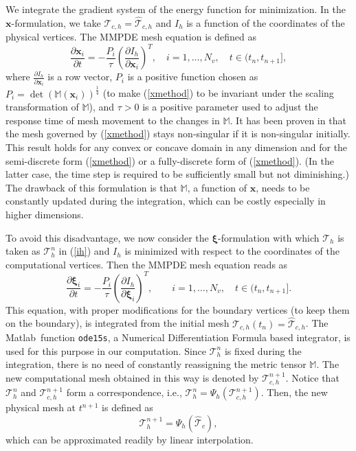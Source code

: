\documentclass{siamart0516}
\def \M{\mathbb{M}}
\newcommand{\bx}{\mathbf{x}}
\newcommand{\bxi}{\bs{\xi}}
\newcommand{\bs}[0]{\boldsymbol}
\theoremstyle{plain}%
\theoremstyle{definition}
\theoremstyle{remark}
\begin{document}
We integrate the gradient system of the energy function for minimization. In the $\bx$-formulation,
we take $\mathcal{T}_{c,h} = \hat{\mathcal{T}}_{c,h}$ and $I_h$ is a function of the coordinates
of the physical vertices. The MMPDE mesh equation is defined as
\begin{equation}
\frac{\partial \bx_i}{\partial t} = - \frac{P_i}{\tau} \left (\frac{\partial I_h}{\partial \bx_i}\right )^T, \quad i = 1,\ldots, N_v,
\quad t \in (t_n, t_{n+1}],
\label{xmethod}
\end{equation}
where $\frac{\partial I_h}{\partial \bx_i}$ is a row vector, $P_i$ is a positive function chosen
as $P_i = \det(\M(\bx_i))^{\frac{1}{4}}$ (to make (\ref{xmethod}) to be invariant under the scaling transformation of $\M$),
and $\tau > 0$ is a positive parameter used to adjust the response time of mesh movement to the changes in $\M$.
It has been proven in \cite{HK2015} that the mesh governed by (\ref{xmethod}) stays non-singular if it is
non-singular initially. This result holds for any convex or concave domain in any dimension
and for the semi-discrete form (\ref{xmethod}) or a fully-discrete form of (\ref{xmethod}).
(In the latter case, the time step is required to be sufficiently small but not diminishing.)
The drawback of this formulation is that $\M$, a function of $\bx$, needs to be constantly updated during
the integration, which can be costly especially in higher dimensions.

To avoid this disadvantage, we now consider the $\bxi$-formulation with which $\mathcal{T}_h$ is taken
as $\mathcal{T}_h^{n}$ in (\ref{ih}) and $I_h$ is minimized with respect to the coordinates of the computational
vertices. Then the MMPDE mesh equation reads as
\begin{equation}
\frac{\partial \bxi_i}{\partial t} = - \frac{P_i}{\tau}\left (\frac{\partial I_h}{\partial \bxi_i}\right )^T,
\qquad i = 1, \ldots, N_v,  \quad t \in (t_n, t_{n+1}] .
\label{ximethod}
\end{equation}
This equation, with proper modifications for the boundary vertices (to keep them on the boundary),
is integrated from the initial mesh $\mathcal{T}_{c,h}(t_n) = \hat{\mathcal{T}}_{c,h}$.
The Matlab\textsuperscript \textregistered\, function {\tt ode15s},
a Numerical Differentiation Formula based integrator,  is used for this purpose in our computation.
Since $\mathcal{T}_h^n$ is fixed during the integration, there is no need of constantly reassigning
the metric tensor $\M$. The new computational mesh obtained in this way is denoted by $\mathcal{T}_{c,h}^{n+1}$.
Notice that $\mathcal{T}_h^n$ and $\mathcal{T}_{c,h}^{n+1}$ form a correspondence, i.e.,
$\mathcal{T}_h^n = \Psi_h(\mathcal{T}_{c,h}^{n+1})$.  Then, the new physical mesh at $t^{n+1}$
is defined as
\[
\mathcal{T}_h^{n+1} =  \Psi_h( \hat{\mathcal{T}}_c),
\]
which can be approximated readily by linear interpolation.
\end{document}
